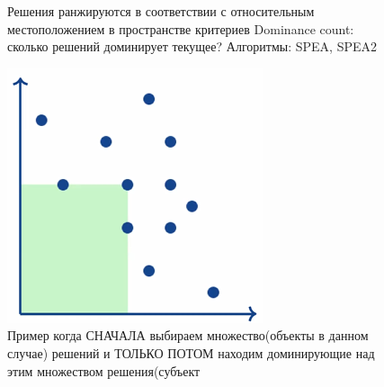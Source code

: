 \begin{figure}[!ht]
Решения ранжируются в соответствии с относительным местоположением в
пространстве критериев
Dominance count: сколько решений доминирует текущее?
Алгоритмы: SPEA, SPEA2
\begin{center}
    \includegraphics[width=1.2\linewidth]{images/Dominate_2.PNG}
    \caption{Пример когда СНАЧАЛА выбираем множество(объекты в данном случае) решений и ТОЛЬКО ПОТОМ находим доминирующие над этим множеством решения(субъект}
    \label{fig:mpr}
\end{center}
\end{figure}


